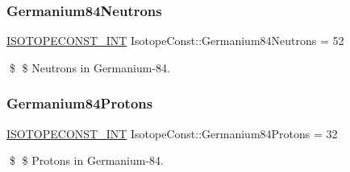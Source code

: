 \subsubsection{\texorpdfstring{Germanium84\+Neutrons}{Germanium84Neutrons}}
{\footnotesize\ttfamily \mbox{\hyperlink{group___isotope_const-_macros_ga5f18360b3e99483a35c32d789e62621c}{I\+S\+O\+T\+O\+P\+E\+C\+O\+N\+S\+T\+\_\+\+I\+NT}} Isotope\+Const\+::\+Germanium84\+Neutrons = 52}

\$ \$ Neutrons in Germanium-\/84. \mbox{\label{group___isotope_const-_germanium-_ge84_gaddf7bd04668b67534096247280924512}} 
\subsubsection{\texorpdfstring{Germanium84\+Protons}{Germanium84Protons}}
{\footnotesize\ttfamily \mbox{\hyperlink{group___isotope_const-_macros_ga5f18360b3e99483a35c32d789e62621c}{I\+S\+O\+T\+O\+P\+E\+C\+O\+N\+S\+T\+\_\+\+I\+NT}} Isotope\+Const\+::\+Germanium84\+Protons = 32}

\$ \$ Protons in Germanium-\/84. 